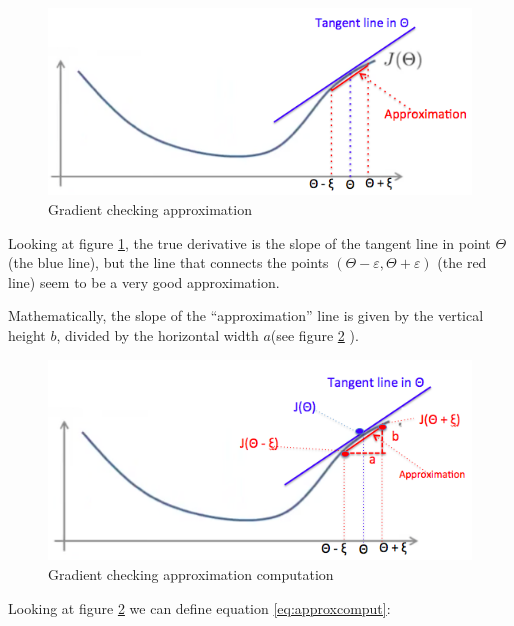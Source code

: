 \begin{figure}[H]
\begin{center}
\includegraphics[scale=0.40]{images/gradcheckapprox}
\end{center}
\caption{Gradient checking approximation } 
\label{fig:gradcheckapprox}
\end{figure}

Looking at figure \ref{fig:gradcheckapprox}, the true derivative is the slope of the tangent line in point $\Theta$ (the blue line), but the line that connects the points $(\Theta - \varepsilon, \Theta + \varepsilon)$ (the red line) seem to be a very good approximation. 

Mathematically, the slope of the ``approximation'' line is given by the vertical height $b$, divided by the horizontal width $a$(see figure \ref{fig:approxcomput} ).

\begin{figure}[H]
\begin{center}
\includegraphics[scale=0.40]{images/approxcomput}
\end{center}
\caption{Gradient checking approximation computation } 
\label{fig:approxcomput}
\end{figure}

Looking at figure \ref{fig:approxcomput} we can define equation \ref{eq:approxcomput}:

